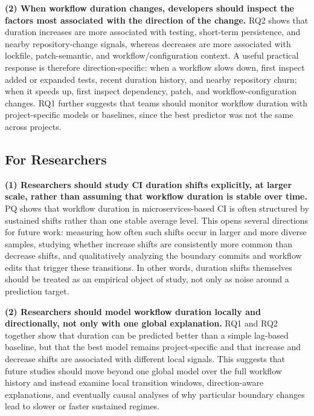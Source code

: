 \documentclass[conference]{IEEEconf}
\begin{document}
\textbf{(2) When workflow duration changes, developers should inspect the factors most associated with the direction of the change.}
RQ2 shows that duration increases are more associated with testing, short-term persistence, and nearby repository-change signals, whereas decreases are more associated with lockfile, patch-semantic, and workflow/configuration context. A useful practical response is therefore direction-specific: when a workflow slows down, first inspect added or expanded tests, recent duration history, and nearby repository churn; when it speeds up, first inspect dependency, patch, and workflow-configuration changes. RQ1 further suggests that teams should monitor workflow duration with project-specific models or baselines, since the best predictor was not the same across projects.

\subsection{For Researchers}

\textbf{(1) Researchers should study CI duration shifts explicitly, at larger scale, rather than assuming that workflow duration is stable over time.}
PQ shows that workflow duration in microservices-based CI is often structured by sustained shifts rather than one stable average level. This opens several directions for future work: measuring how often such shifts occur in larger and more diverse samples, studying whether increase shifts are consistently more common than decrease shifts, and qualitatively analyzing the boundary commits and workflow edits that trigger these transitions. In other words, duration shifts themselves should be treated as an empirical object of study, not only as noise around a prediction target.

\textbf{(2) Researchers should model workflow duration locally and directionally, not only with one global explanation.}
RQ1 and RQ2 together show that duration can be predicted better than a simple lag-based baseline, but that the best model remains project-specific and that increase and decrease shifts are associated with different local signals. This suggests that future studies should move beyond one global model over the full workflow history and instead examine local transition windows, direction-aware explanations, and eventually causal analyses of why particular boundary changes lead to slower or faster sustained regimes.
\end{document}
